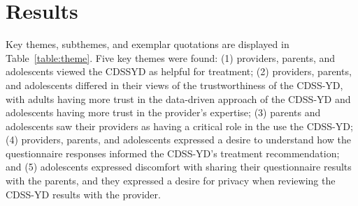 \section{Results}
Key themes, subthemes, and exemplar quotations are
displayed in Table~\ref{table:theme}. Five key themes were found: (1)
providers, parents, and adolescents viewed the CDSSYD as helpful for treatment; (2) providers, parents, and
adolescents differed in their views of the trustworthiness
of the CDSS-YD, with adults having more trust in the
data-driven approach of the CDSS-YD and adolescents
having more trust in the provider’s expertise; (3) parents
and adolescents saw their providers as having a critical
role in the use the CDSS-YD; (4) providers, parents, and
adolescents expressed a desire to understand how the
questionnaire responses informed the CDSS-YD’s treatment recommendation; and (5) adolescents expressed
discomfort with sharing their questionnaire results with
the parents, and they expressed a desire for privacy when
reviewing the CDSS-YD results with the provider.


